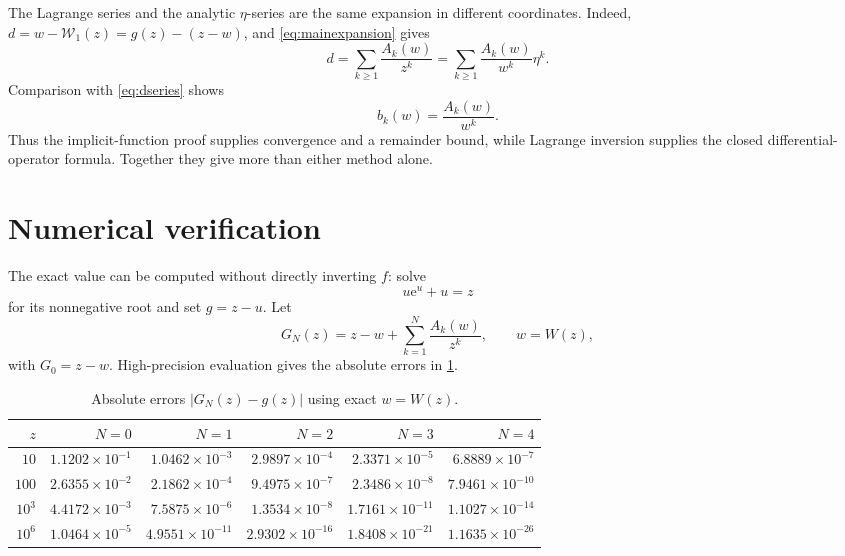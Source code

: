 \documentclass[11pt]{article}
\theoremstyle{clean}
\newcommand{\rLambert}{\mathcal W}
\newcommand{\e}{\mathrm e}
\begin{document}
The Lagrange series and the analytic \(\eta\)-series are the same expansion in
different coordinates.  Indeed, \(d=w-\rLambert_1(z)=g(z)-(z-w)\), and
\cref{eq:mainexpansion} gives
\[
 d=\sum_{k\ge1}\frac{A_k(w)}{z^k}
  =\sum_{k\ge1}\frac{A_k(w)}{w^k}\eta^k.
\]
Comparison with \cref{eq:dseries} shows
\begin{equation}\label{eq:bkAk}
  b_k(w)=\frac{A_k(w)}{w^k}.
\end{equation}
Thus the implicit-function proof supplies convergence and a remainder bound,
while Lagrange inversion supplies the closed differential-operator formula.
Together they give more than either method alone.

\section{Numerical verification}

The exact value can be computed without directly inverting \(f\): solve
\begin{equation}\label{eq:numericalu}
  u\e^u+u=z
\end{equation}
for its nonnegative root and set \(g=z-u\).  Let
\begin{equation}\label{eq:GN}
  G_N(z)=z-w+\sum_{k=1}^{N}\frac{A_k(w)}{z^k},
  \qquad w=W(z),
\end{equation}
with \(G_0=z-w\).  High-precision evaluation gives the absolute errors in
\cref{tab:errors}.

\begin{table}[htbp]
\centering
\caption{Absolute errors \(\lvert G_N(z)-g(z)\rvert\) using exact \(w=W(z)\).}
\label{tab:errors}
\small
\begin{tabular}{@{}rrrrrr@{}}
\toprule
\(z\) & \(N=0\) & \(N=1\) & \(N=2\) & \(N=3\) & \(N=4\)\\
\midrule
\(10\) & \(1.1202\times10^{-1}\) & \(1.0462\times10^{-3}\) & \(2.9897\times10^{-4}\) & \(2.3371\times10^{-5}\) & \(6.8889\times10^{-7}\)\\
\(100\) & \(2.6355\times10^{-2}\) & \(2.1862\times10^{-4}\) & \(9.4975\times10^{-7}\) & \(2.3486\times10^{-8}\) & \(7.9461\times10^{-10}\)\\
\(10^3\) & \(4.4172\times10^{-3}\) & \(7.5875\times10^{-6}\) & \(1.3534\times10^{-8}\) & \(1.7161\times10^{-11}\) & \(1.1027\times10^{-14}\)\\
\(10^6\) & \(1.0464\times10^{-5}\) & \(4.9551\times10^{-11}\) & \(2.9302\times10^{-16}\) & \(1.8408\times10^{-21}\) & \(1.1635\times10^{-26}\)\\
\bottomrule
\end{tabular}
\end{table}
\end{document}
